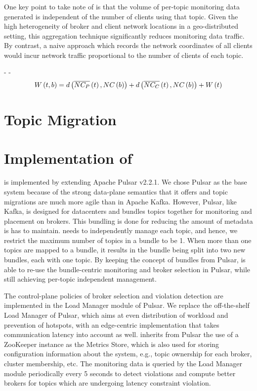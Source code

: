 \par One key point to take note of is that the volume of per-topic monitoring data generated is independent of the number of clients using that topic. Given the high heterogeneity of broker and client network locations in a geo-distributed setting, this aggregation technique significantly reduces monitoring data traffic. By contrast, a naive approach which records the network coordinates of all clients would incur network traffic proportional to the number of clients of each topic.

- 
- 
\begin{equation}
W \left( t, b\right) = d \left( \overline{NC_P} \left( t \right), NC \left( b \right) \right) + d \left( \overline{NC_C} \left( t \right), NC \left( b \right) \right) + W \left( t \right) 
\vspace{-0.05in}
\end{equation}

\section{Topic Migration}

\section{Implementation of \epulsar{}}
\label{sec:epulsar_impl}
\epulsar{} is implemented by extending Apache Pulsar v2.2.1. We chose Pulsar as the base system because of the strong data-plane semantics that it offers and topic migrations are much more agile than in Apache Kafka. However, Pulsar, like Kafka, is designed for datacenters and bundles topics together for monitoring and placement on brokers. This bundling is done for reducing the amount of metadata is has to maintain. \epulsar{} needs to independently manage each topic, and hence, we restrict the maximum number of topics in a bundle to be 1. When more than one topics are mapped to a bundle, it results in the bundle being split into two new bundles, each with one topic. By keeping the concept of bundles from Pulsar, \epulsar{} is able to re-use the bundle-centric monitoring and broker selection in Pulsar, while still achieving per-topic independent management.
\par The control-plane policies of broker selection and violation detection are implemented in the Load Manager module of Pulsar. We replace the off-the-shelf Load Manager of Pulsar, which aims at even distribution of workload and prevention of hotspots, with an edge-centric implementation that takes communication latency into account as well. \epulsar{} inherits from Pulsar the use of a ZooKeeper instance as the Metrics Store, which is also used for storing configuration information about the system, e.g., topic ownership for each broker, cluster membership, etc. The monitoring data is queried by the Load Manager module periodically every 5 seconds to detect violations and compute better brokers for topics which are undergoing latency constraint violation.

